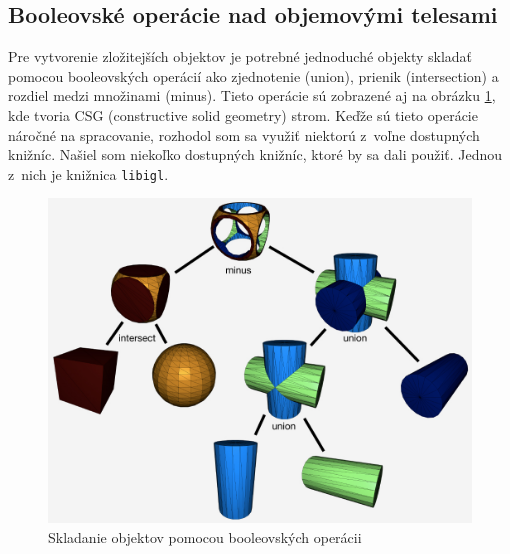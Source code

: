 






\subsection*{Booleovské operácie nad objemovými telesami}
\label{sec:CSG}
Pre vytvorenie zložitejších objektov je potrebné jednoduché objekty skladať pomocou booleovských operácií ako zjednotenie (union), prienik (intersection) a rozdiel medzi množinami (minus). Tieto operácie sú zobrazené aj na obrázku \ref{fig:BooleanOperation}, kde tvoria CSG (constructive solid geometry) strom. Keďže sú tieto operácie náročné na spracovanie, rozhodol som sa využiť niektorú z~voľne dostupných knižníc. Našiel som niekoľko dostupných knižníc, ktoré by sa dali použiť. Jednou z~nich je knižnica \texttt{libigl}.
\begin{figure}[H]
	\centering
	\includegraphics[width=\textwidth]{obrazky-figures/cube-sphere-cylinders-csg-tree.jpg}
	\caption{Skladanie objektov pomocou booleovských operácii \cite{libigl}}
	\label{fig:BooleanOperation}
\end{figure}
